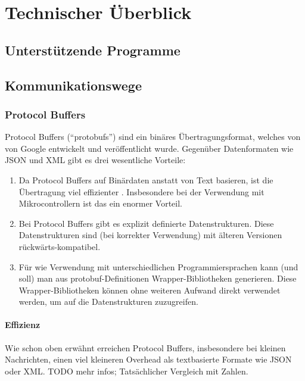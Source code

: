 
\section{Technischer Überblick}
\label{sec:ueberblick}


\subsection{Unterstützende Programme}
\label{subsec:ueberblick_programs}

\subsection{Kommunikationswege}
\label{subsec:ueberblick_comms}

\subsubsection{Protocol Buffers}
\label{subsec:ueberblick_protobufs}
Protocol Buffers \cite{protobufs} (``protobufs'') sind ein binäres Übertragungsformat,
welches von von Google entwickelt und veröffentlicht wurde.
%
Gegenüber Datenformaten wie JSON und XML gibt es drei wesentliche Vorteile:
\begin{enumerate}
    \item Da Protocol Buffers auf Binärdaten anstatt von Text basieren,
    ist die Übertragung viel effizienter \cite{7765670}.
    Insbesondere bei der Verwendung mit Mikrocontrollern ist das ein enormer Vorteil.

    \item Bei Protocol Buffers gibt es explizit definierte Datenstrukturen.
    Diese Datenstrukturen sind (bei korrekter Verwendung) mit älteren Versionen rückwärts-kompatibel.

    \item Für wie Verwendung mit unterschiedlichen Programmiersprachen kann (und soll) man aus protobuf-Definitionen
    Wrapper-Bibliotheken generieren.
    Diese Wrapper-Bibliotheken können ohne weiteren Aufwand direkt verwendet werden,
    um auf die Datenstrukturen zuzugreifen.
\end{enumerate}

\paragraph{Effizienz}
Wie schon oben erwähnt erreichen Protocol Buffers,
insbesondere bei kleinen Nachrichten,
einen viel kleineren Overhead als textbasierte Formate wie JSON oder XML.
%
TODO mehr infos; Tatsächlicher Vergleich mit Zahlen.



